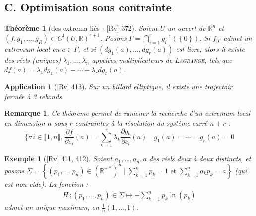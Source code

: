 \documentclass[10pt, a4paper, parskip=full, twoside, twocolumn]{report}
\newtheorem{theorem}[definition]{Théorème}
\newtheorem{example}[definition]{Exemple}
\newtheorem{remark}[definition]{Remarque}
\newtheorem{application}[definition]{Application}
\newcommand{\IR}{\mathbb{R}}
\begin{document}
\subsection*{C. Optimisation sous contrainte}


\begin{theorem}[des extrema liés - \textnormal{[Rv] 372}]
	Soient $U$ un ouvert de $\IR^n$ et $(f,g_1,\dots, g_R)\in C^1(U,\IR)^{r+1}$. 
	Posons $\Gamma = \bigcap_{i=1}^r g_i^{-1}(\left\{0\right\})$.
	Si $f_{\mid \Gamma}$ admet un extremum local en $a\in \Gamma$, et si $(dg_1(a),\dots, dg_r(a))$ est libre, alors il existe des réels (uniques) $\lambda_1,\dots, \lambda_n$ appelées \emph{multiplicateurs de \textsc{Lagrange}},
	tels que $df(a) = \lambda_1dg_1(a)+\cdots + \lambda_r dg_r(a)$.
\end{theorem}

 \begin{tcolorbox}[
    breakable, %
    colback=developpement, %
    colframe=gray!0!black, %
    boxrule=0pt, %
    arc=1mm, %
	boxsep=0pt,
	left=0pt, right=0pt, top=0pt, bottom=0pt
]
\begin{application}[\textnormal{[Rv] 413}]
	\label{219dev2}
	Sur un billard elliptique, il existe une trajectoir fermée à 3 rebonds.
\end{application}
\end{tcolorbox}

\begin{remark}
	Ce théorème permet de ramener la recherche d'un extremum local en dimension $n$ sous $r$ contraintes à la résolution du système carré $n+r$ :
	$$\{ \forall i\in\llbracket 1,n\rrbracket,\, \frac{\partial f}{\partial e_i}(a) = \sum_{k=1}^{r}\lambda_k\frac{\partial g_k}{\partial e_i}(a)\quad g_1(a) = \cdots = g_r(a) = 0$$
\end{remark}

\begin{example}[\textnormal{[Rv] 411, 412}]
Soient $a_1,\dots, a_n,a$ des réels deux à deux distincts, et posons $\Sigma = \left\{(p_1,\dots,p_n)\in \left(\IR^{+*}\right)^n \mid \sum_{k=1}^{n} p_k = 1\text{ et } \sum_{k=1}^{n}a_kp_k = a\right\}$ (qui est non vide).
La fonction :
\begin{align*}
	H\,\colon (p_1,\dots,p_n)\in\Sigma\mapsto -\sum_{k=1}^{n} p_k\ln(p_k)
\end{align*}
admet un unique maximum, en $\frac{1}{n}(1,\dots,1)$.
\end{example}
\end{document}
